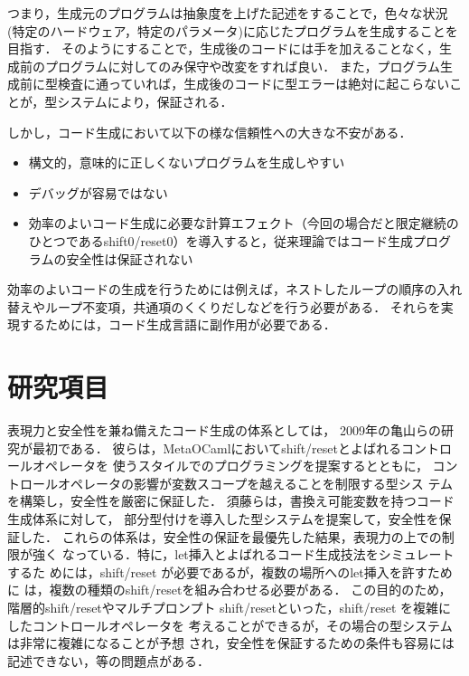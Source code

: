 \documentclass[10pt,a4j,twocolumn]{jarticle}
\theoremstyle{definition}
\begin{document}
つまり，生成元のプログラムは抽象度を上げた記述をすることで，色々な状況(特定のハードウェア，特定のパラメータ)に応じたプログラムを生成することを目指す．
そのようにすることで，生成後のコードには手を加えることなく，生成前のプログラムに対してのみ保守や改変をすれば良い．
また，プログラム生成前に型検査に通っていれば，生成後のコードに型エラーは絶対に起こらないことが，型システムにより，保証される．

しかし，コード生成において以下の様な信頼性への大きな不安がある．

\begin{itemize}
\item 構文的，意味的に正しくないプログラムを生成しやすい
\item デバッグが容易ではない
\item 効率のよいコード生成に必要な計算エフェクト（今回の場合だと限定継続のひとつであるshift0/reset0）を導入すると，従来理論ではコード生成プログラムの安全性は保証されない
\end{itemize}

効率のよいコードの生成を行うためには例えば，ネストしたループの順序の入れ替えやループ不変項，共通項のくくりだしなどを行う必要がある．
それらを実現するためには，コード生成言語に副作用が必要である．

\section{研究項目}
表現力と安全性を兼ね備えたコード生成の体系としては，
2009年の亀山らの研究\cite{Kameyama2009}が最初である．
彼らは，MetaOCamlにおいてshift/resetとよばれるコントロールオペレータを
使うスタイルでのプログラミングを提案するとともに，
コントロールオペレータの影響が変数スコープを越えることを制限する型シス
テムを構築し，安全性を厳密に保証した．
須藤ら\cite{Sudo2014}は，書換え可能変数を持つコード生成体系に対して，
部分型付けを導入した型システムを提案して，安全性を保証した．
これらの体系は，安全性の保証を最優先した結果，表現力の上での制限が強く
なっている．特に，let挿入とよばれるコード生成技法をシミュレートするた
めには，shift/reset が必要であるが，複数の場所へのlet挿入を許すために
は，複数の種類のshift/resetを組み合わせる必要がある．
この目的のため，階層的shift/resetやマルチプロンプト
shift/resetといった，shift/reset を複雑にしたコントロールオペレータを
考えることができるが，その場合の型システムは非常に複雑になることが予想
され，安全性を保証するための条件も容易には記述できない，等の問題点がある．
\end{document}
